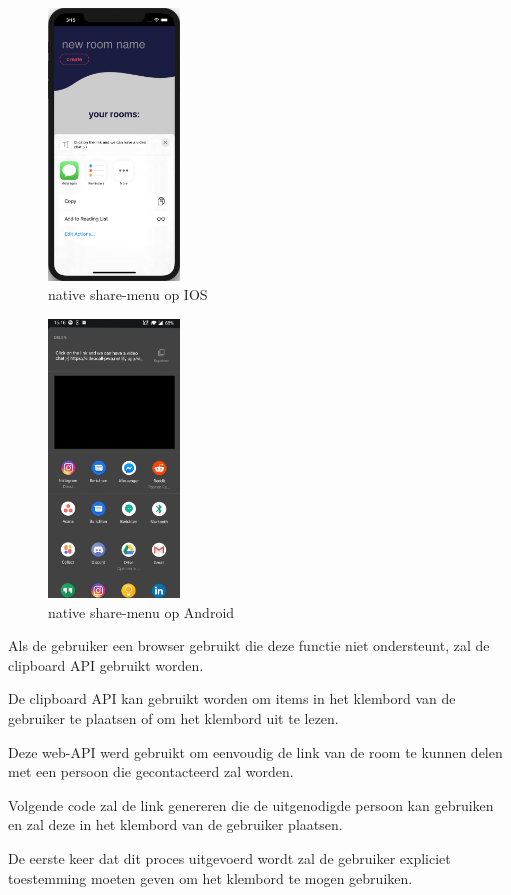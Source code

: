 		\begin{figure}[H]
			\centering
			\includegraphics[width=35mm]{./img/share-ios}{}
			\caption{native share-menu op IOS}
		\end{figure}	
		\begin{figure}[H]
			\centering
			\includegraphics[width=35mm]{./img/share-android.jpg}{}
			\caption{native share-menu op Android}
		\end{figure}

		Als de gebruiker een browser gebruikt die deze functie niet ondersteunt, zal de clipboard API gebruikt worden.
	
		De clipboard API kan gebruikt worden om items in het klembord van de gebruiker te plaatsen of om het klembord uit te lezen.
		
		Deze web-API werd gebruikt om eenvoudig de link van de room te kunnen delen met een persoon die gecontacteerd zal worden.
		
		Volgende code zal de link genereren die de uitgenodigde persoon kan gebruiken en zal deze in het klembord van de gebruiker plaatsen.
		
		De eerste keer dat dit proces uitgevoerd wordt zal de gebruiker expliciet toestemming moeten geven om het klembord te mogen gebruiken.

